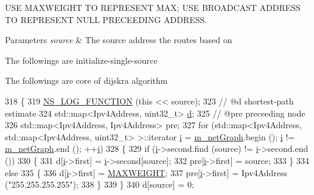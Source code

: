 U\+SE M\+A\+X\+W\+E\+I\+G\+HT TO R\+E\+P\+R\+E\+S\+E\+NT M\+AX; U\+SE B\+R\+O\+A\+D\+C\+A\+ST A\+D\+D\+R\+E\+SS TO R\+E\+P\+R\+E\+S\+E\+NT N\+U\+LL P\+R\+E\+C\+E\+E\+D\+I\+NG A\+D\+D\+R\+E\+SS. 


\begin{DoxyParams}{Parameters}
{\em source} & The source address the routes based on \\
\hline
\end{DoxyParams}
The followings are initialize-\/single-\/source

The followings are core of dijskra algorithm
\begin{DoxyCode}
318 \{
319   \hyperlink{log-macros-disabled_8h_a90b90d5bad1f39cb1b64923ea94c0761}{NS\_LOG\_FUNCTION} (\textcolor{keyword}{this} << source);
323   \textcolor{comment}{// @d shortest-path estimate}
324   std::map<Ipv4Address, uint32\_t> \hyperlink{buildings__pathloss_8m_a9f9b934daed17a4d3613b6886ff4cf4b}{d};
325   \textcolor{comment}{// @pre preceeding node}
326   std::map<Ipv4Address, Ipv4Address> pre;
327   \textcolor{keywordflow}{for} (std::map<Ipv4Address, std::map<Ipv4Address, uint32\_t> >::iterator \hyperlink{bernuolliDistribution_8m_a6f6ccfcf58b31cb6412107d9d5281426}{i} = 
      \hyperlink{classns3_1_1dsr_1_1DsrRouteCache_a001b3261dc9f91bf3713b73c32206ee6}{m\_netGraph}.begin (); \hyperlink{bernuolliDistribution_8m_a6f6ccfcf58b31cb6412107d9d5281426}{i} != \hyperlink{classns3_1_1dsr_1_1DsrRouteCache_a001b3261dc9f91bf3713b73c32206ee6}{m\_netGraph}.end (); ++\hyperlink{bernuolliDistribution_8m_a6f6ccfcf58b31cb6412107d9d5281426}{i})
328     \{
329       \textcolor{keywordflow}{if} (\hyperlink{bernuolliDistribution_8m_a6f6ccfcf58b31cb6412107d9d5281426}{i}->second.find (source) != \hyperlink{bernuolliDistribution_8m_a6f6ccfcf58b31cb6412107d9d5281426}{i}->second.end ())
330         \{
331           d[\hyperlink{bernuolliDistribution_8m_a6f6ccfcf58b31cb6412107d9d5281426}{i}->first] = \hyperlink{bernuolliDistribution_8m_a6f6ccfcf58b31cb6412107d9d5281426}{i}->second[source];
332           pre[\hyperlink{bernuolliDistribution_8m_a6f6ccfcf58b31cb6412107d9d5281426}{i}->first] = source;
333         \}
334       \textcolor{keywordflow}{else}
335         \{
336           d[\hyperlink{bernuolliDistribution_8m_a6f6ccfcf58b31cb6412107d9d5281426}{i}->first] = \hyperlink{dsr-rcache_8h_a667684b091336e57674db9e4480b61b7}{MAXWEIGHT};
337           pre[\hyperlink{bernuolliDistribution_8m_a6f6ccfcf58b31cb6412107d9d5281426}{i}->first] = Ipv4Address (\textcolor{stringliteral}{"255.255.255.255"});
338         \}
339     \}
340   d[source] = 0;

\end{DoxyCode}
